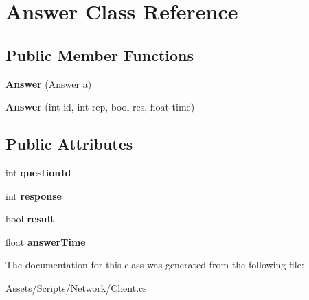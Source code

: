 \hypertarget{class_answer}{\section{Answer Class Reference}
\label{class_answer}
}
\subsection*{Public Member Functions}
\begin{DoxyCompactItemize}
\item 
\hypertarget{class_answer_ad3b2607168b59619871b3385f57d1d75}{{\bfseries Answer} (\hyperlink{class_answer}{Answer} a)}\label{class_answer_ad3b2607168b59619871b3385f57d1d75}

\item 
\hypertarget{class_answer_adbc75e00e72b4612f2ccd1a8e5195869}{{\bfseries Answer} (int id, int rep, bool res, float time)}\label{class_answer_adbc75e00e72b4612f2ccd1a8e5195869}

\end{DoxyCompactItemize}
\subsection*{Public Attributes}
\begin{DoxyCompactItemize}
\item 
\hypertarget{class_answer_af4e62ec289285978a0288fc25bb1a21d}{int {\bfseries question\-Id}}\label{class_answer_af4e62ec289285978a0288fc25bb1a21d}

\item 
\hypertarget{class_answer_abcab03cbe5b3d0bd2da86ee18e678e4d}{int {\bfseries response}}\label{class_answer_abcab03cbe5b3d0bd2da86ee18e678e4d}

\item 
\hypertarget{class_answer_a06a3bb5a8b0eddc8714cb5f202196c6a}{bool {\bfseries result}}\label{class_answer_a06a3bb5a8b0eddc8714cb5f202196c6a}

\item 
\hypertarget{class_answer_a8212db63fbae5edc4417b6fc363fdea2}{float {\bfseries answer\-Time}}\label{class_answer_a8212db63fbae5edc4417b6fc363fdea2}

\end{DoxyCompactItemize}


The documentation for this class was generated from the following file\-:\begin{DoxyCompactItemize}
\item 
Assets/\-Scripts/\-Network/Client.\-cs\end{DoxyCompactItemize}
